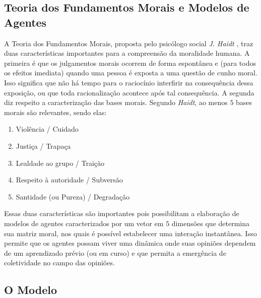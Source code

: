 \documentclass[11pt]{article}
\begin{document}
\subsection{Teoria dos Fundamentos Morais e Modelos de Agentes}

A Teoria dos Fundamentos Morais, proposta pelo psicólogo social {\it J.
Haidt} \cite{Haidt}, traz duas características importantes para a compreensão
da moralidade humana. A primeira é que os julgamentos morais ocorrem de forma
espontânea e (para todos os efeitos imediata) quando uma pessoa é exposta a uma
questão de cunho moral. Isso significa que não há tempo para o raciocínio
interfirir na consequência dessa exposição, ou que toda racionalização
acontece após tal consequência. A segunda diz respeito a caracterização das
bases morais. Segundo {\it Haidt}, ao menos $5$ bases morais são relevantes,
sendo elas:
\begin{enumerate}
    \item Violência / Cuidado
    \item Justiça / Trapaça
    \item Lealdade ao grupo / Traição
    \item Respeito à autoridade / Subversão
    \item Santidade (ou Pureza) / Degradação
\end{enumerate}

Essas duas características são importantes pois possibilitam a elaboração de
modelos de agentes caracterizados por um vetor em $5$ dimensões
que determina
sua matriz moral, nos quais é possível estabelecer uma interação instantânea.
Isso permite que os agentes possam viver
uma dinâmica onde suas opiniões dependem de um aprendizado prévio (ou em curso)
e que permita a emergência de coletividade no campo das opiniões.

\subsection{O Modelo}

\newcommand{\w}[1]{%
    \ensuremath{\displaystyle%
        \bold{w}_{#1}        
    }
}

\newcommand{\zt}{%
    \ensuremath{\displaystyle%
        \bold{z}        
    }
}

\newcommand{\ip}[2]{%
    \ensuremath{\displaystyle%
        {#1} \cdot {#2}
    }
}

\newcommand{\inp}[1]{\ensuremath{\displaystyle%
    \left(#1\right)}}

\newcommand{\ina}[1]{\ensuremath{\displaystyle%
    \left<#1\right>}}
\end{document}
